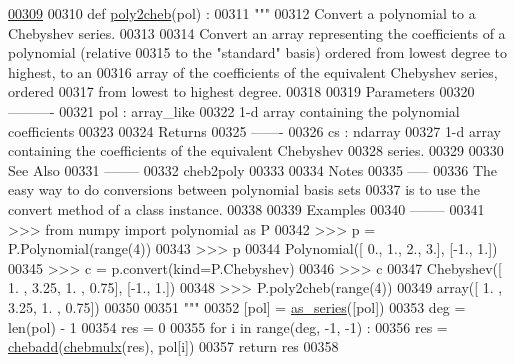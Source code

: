 \begin{DoxyCode}
\hypertarget{namespacepyneb_1_1utils_1_1chebyshev_l00309}{}\hyperlink{namespacepyneb_1_1utils_1_1chebyshev_abd824b0c3e5e2cc0f9464a0986dc3819}{00309} 
00310 \textcolor{keyword}{def }\hyperlink{namespacepyneb_1_1utils_1_1chebyshev_abd824b0c3e5e2cc0f9464a0986dc3819}{poly2cheb}(pol) :
00311     \textcolor{stringliteral}{"""}
00312 \textcolor{stringliteral}{    Convert a polynomial to a Chebyshev series.}
00313 \textcolor{stringliteral}{}
00314 \textcolor{stringliteral}{    Convert an array representing the coefficients of a polynomial (relative}
00315 \textcolor{stringliteral}{    to the "standard" basis) ordered from lowest degree to highest, to an}
00316 \textcolor{stringliteral}{    array of the coefficients of the equivalent Chebyshev series, ordered}
00317 \textcolor{stringliteral}{    from lowest to highest degree.}
00318 \textcolor{stringliteral}{}
00319 \textcolor{stringliteral}{    Parameters}
00320 \textcolor{stringliteral}{    ----------}
00321 \textcolor{stringliteral}{    pol : array\_like}
00322 \textcolor{stringliteral}{        1-d array containing the polynomial coefficients}
00323 \textcolor{stringliteral}{}
00324 \textcolor{stringliteral}{    Returns}
00325 \textcolor{stringliteral}{    -------}
00326 \textcolor{stringliteral}{    cs : ndarray}
00327 \textcolor{stringliteral}{        1-d array containing the coefficients of the equivalent Chebyshev}
00328 \textcolor{stringliteral}{        series.}
00329 \textcolor{stringliteral}{}
00330 \textcolor{stringliteral}{    See Also}
00331 \textcolor{stringliteral}{    --------}
00332 \textcolor{stringliteral}{    cheb2poly}
00333 \textcolor{stringliteral}{}
00334 \textcolor{stringliteral}{    Notes}
00335 \textcolor{stringliteral}{    -----}
00336 \textcolor{stringliteral}{    The easy way to do conversions between polynomial basis sets}
00337 \textcolor{stringliteral}{    is to use the convert method of a class instance.}
00338 \textcolor{stringliteral}{}
00339 \textcolor{stringliteral}{    Examples}
00340 \textcolor{stringliteral}{    --------}
00341 \textcolor{stringliteral}{    >>> from numpy import polynomial as P}
00342 \textcolor{stringliteral}{    >>> p = P.Polynomial(range(4))}
00343 \textcolor{stringliteral}{    >>> p}
00344 \textcolor{stringliteral}{    Polynomial([ 0.,  1.,  2.,  3.], [-1.,  1.])}
00345 \textcolor{stringliteral}{    >>> c = p.convert(kind=P.Chebyshev)}
00346 \textcolor{stringliteral}{    >>> c}
00347 \textcolor{stringliteral}{    Chebyshev([ 1.  ,  3.25,  1.  ,  0.75], [-1.,  1.])}
00348 \textcolor{stringliteral}{    >>> P.poly2cheb(range(4))}
00349 \textcolor{stringliteral}{    array([ 1.  ,  3.25,  1.  ,  0.75])}
00350 \textcolor{stringliteral}{}
00351 \textcolor{stringliteral}{    """}
00352     [pol] = \hyperlink{namespacepyneb_1_1utils_1_1polyutils_a9c3751d438f0f75922155c7823fe2699}{as\_series}([pol])
00353     deg = len(pol) - 1
00354     res = 0
00355     \textcolor{keywordflow}{for} i \textcolor{keywordflow}{in} range(deg, -1, -1) :
00356         res = \hyperlink{namespacepyneb_1_1utils_1_1chebyshev_aafceea7ad9a5a18707fcf493bcf70457}{chebadd}(\hyperlink{namespacepyneb_1_1utils_1_1chebyshev_a91d78fa31041dfe9ccf7bbc0891809b3}{chebmulx}(res), pol[i])
00357     \textcolor{keywordflow}{return} res
00358 


\end{DoxyCode}
